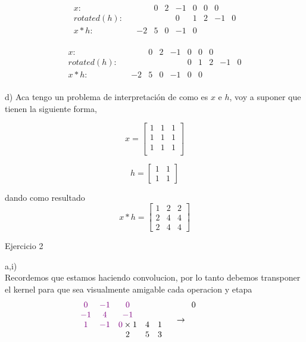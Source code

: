 \documentclass[11pt]{article}
\begin{document}
\[
\begin{array}{ccccccccccc}
x: & & & 0& 2& -1&0 &0 &0 \\
rotated(h): & & & & &0 &1&2 &-1&0 \\
x*h: & & -2&5 & 0& -1& 0& \\
\end{array}
\]

\[
\begin{array}{ccccccccccc}
x: & & & 0& 2& -1&0 &0 &0 \\
rotated(h): & & & & & &0&1 &2&-1 &0 \\
x*h: & & -2&5 & 0& -1& 0& 0\\
\end{array}
\]

d) Aca tengo un problema de interpretación de como es $x$ e $h$, voy a suponer que tienen la siguiente forma, 

\[
x = \begin{bmatrix}
1 & 1 & 1  \\
1 & 1 & 1  \\
1 & 1 & 1  \\
\end{bmatrix}
\]

\[
h = \begin{bmatrix}
1 & 1 \\
1 & 1
\end{bmatrix}
\]

dando como resultado \\ 

\[
x*h = \begin{bmatrix}
    1 & 2 & 2 \\ 
    2 & 4 & 4 \\ 
    2 & 4 & 4
\end{bmatrix}
\]

Ejercicio 2

a,i) \\

Recordemos que estamos haciendo convolucion, por lo tanto debemos transponer el kernel para que sea visualmente amigable cada operacion y etapa 
\[
\begin{array}{cccccccc}
    \textcolor{violet}{0}&\textcolor{violet}{-1}&\textcolor{violet}{0}& & \\
    \textcolor{violet}{-1}&\textcolor{violet}{4}&\textcolor{violet}{-1}& & \\
    \textcolor{violet}{1}&\textcolor{violet}{-1}&\textcolor{violet}{0} \times 1 & 4 & 1 \\ 
    & & 2 & 5 & 3 & \\ 
\end{array}
\rightarrow
\begin{array}{ccccc}
    0 &  &  & &  \\
     &  &  & &  \\
     &  &  & &  \\
     &  &  & &  \\
\end{array}
\]
\end{document}
